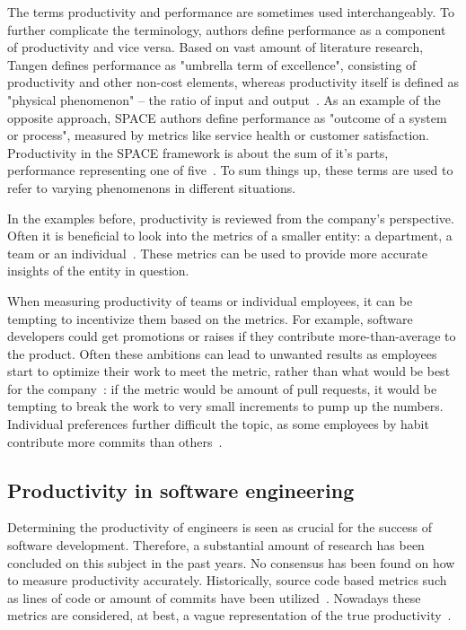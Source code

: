 The terms productivity and performance are sometimes used interchangeably. To further complicate the terminology, authors define performance as a component of productivity and vice versa. Based on vast amount of literature research, Tangen defines performance as "umbrella term of excellence", consisting of productivity and other non-cost elements, whereas productivity itself is defined as "physical phenomenon" – the ratio of input and output~\cite{tangen_demystifying_2005}. As an example of the opposite approach, SPACE authors define performance as "outcome of a system or process", measured by metrics like service health or customer satisfaction. Productivity in the SPACE framework is about the sum of it's parts, performance representing one of five~\cite{forsgren_space_2021}. To sum things up, these terms are used to refer to varying phenomenons in different situations.

In the examples before, productivity is reviewed from the company's perspective. Often it is beneficial to look into the metrics of a smaller entity: a department, a team or an individual~\cite{forsgren_space_2021, tangen_demystifying_2005}. These metrics can be used to provide more accurate insights of the entity in question.

When measuring productivity of teams or individual employees, it can be tempting to incentivize them based on the metrics. For example, software developers could get promotions or raises if they contribute more-than-average to the product. Often these ambitions can lead to unwanted results as employees start to optimize their work to meet the metric, rather than what would be best for the company~\cite{symons_software_2010, chew_no-nonsense_1988}: if the metric would be amount of pull requests, it would be tempting to break the work to very small increments to pump up the numbers. Individual preferences further difficult the topic, as some employees by habit contribute more commits than others~\cite{oliveira_code_2020}. 

\subsection{Productivity in software engineering}
Determining the productivity of engineers is seen as crucial for the success of software development. Therefore, a substantial amount of research has been concluded on this subject in the past years.\cite{oliveira_code_2020} No consensus has been found on how to measure productivity accurately. Historically, source code based metrics such as lines of code or amount of commits have been utilized~\cite{oliveira_code_2020}. Nowadays these metrics are considered, at best, a vague representation of the true productivity~\cite{forsgren_space_2021}.

